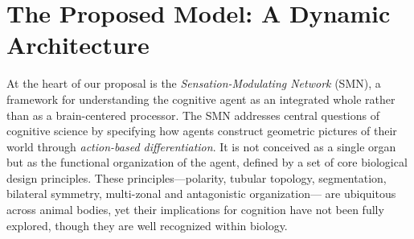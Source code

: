 
\section{The Proposed Model: A Dynamic Architecture}
\label{sec:model}

At the heart of our proposal is the \emph{Sensation-Modulating Network} (SMN), 
a framework for understanding the cognitive agent as an integrated whole rather than 
as a brain-centered processor. The SMN addresses central questions of cognitive science 
by specifying how agents construct geometric pictures of their world through 
\emph{action-based differentiation}. It is not conceived as a single organ but as the 
functional organization of the agent, defined by a set of core biological design principles. 
These principles—polarity, tubular topology, segmentation, bilateral symmetry, multi-zonal and antagonistic organization—
are ubiquitous across animal bodies, yet their implications 
for cognition have not been fully explored, though they are well recognized within biology.

















